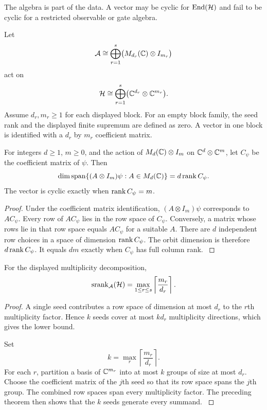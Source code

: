 The algebra is part of the data. A vector may be cyclic for \(\End(\Hcal)\) and fail to be cyclic for a restricted observable or gate algebra.

Let
\[
\Acal
\cong
\bigoplus_{r=1}^{s}
\bigl(M_{d_r}(\CC)\otimes I_{m_r}\bigr)
\]
act on
\[
\Hcal
\cong
\bigoplus_{r=1}^{s}
\bigl(\CC^{d_r}\otimes\CC^{m_r}\bigr).
\]
Assume \(d_r,m_r\ge1\) for each displayed block. For an empty block family, the seed rank and the displayed finite supremum are defined as zero. A vector in one block is identified with a \(d_r\) by \(m_r\) coefficient matrix.

\begin{theorem}\label{strong:theorem:001}\label{strong:thm:orbit_dimension}
For integers \(d\ge1\), \(m\ge0\), and the action of \(M_d(\CC)\otimes I_m\) on \(\CC^d\otimes\CC^m\), let \(C_\psi\) be the coefficient matrix of \(\psi\). Then
\[
\dim\operatorname{span}\{(A\otimes I_m)\psi:A\in M_d(\CC)\}
=
 d\rank C_\psi.
\]
The vector is cyclic exactly when \(\operatorname{rank} C_\psi=m\).
\end{theorem}

\begin{proof}\label{strong:proof:001}
Under the coefficient matrix identification, \((A\otimes I_m)\psi\) corresponds to \(AC_\psi\). Every row of \(AC_\psi\) lies in the row space of \(C_\psi\). Conversely, a matrix whose rows lie in that row space equals \(AC_\psi\) for a suitable \(A\). There are \(d\) independent row choices in a space of dimension \(\operatorname{rank} C_\psi\). The orbit dimension is therefore \(d\operatorname{rank} C_\psi\). It equals \(dm\) exactly when \(C_\psi\) has full column rank.
\label{strong:proof:001:end}\end{proof}

\begin{theorem}\label{strong:theorem:002}\label{strong:thm:quantum_seed_rank}
For the displayed multiplicity decomposition,
\[
\operatorname{srank}_{\Acal}(\Hcal)
=
\max_{1\le r\le s}
\left\lceil\frac{m_r}{d_r}\right\rceil.
\]
\end{theorem}

\begin{proof}\label{strong:proof:002}
A single seed contributes a row space of dimension at most \(d_r\) to the \(r\)th multiplicity factor. Hence \(k\) seeds cover at most \(kd_r\) multiplicity directions, which gives the lower bound.

Set
\[
k=\max_r\left\lceil\frac{m_r}{d_r}\right\rceil.
\]
For each \(r\), partition a basis of \(\CC^{m_r}\) into at most \(k\) groups of size at most \(d_r\). Choose the coefficient matrix of the \(j\)th seed so that its row space spans the \(j\)th group. The combined row spaces span every multiplicity factor. The preceding theorem then shows that the \(k\) seeds generate every summand.
\label{strong:proof:002:end}\end{proof}

